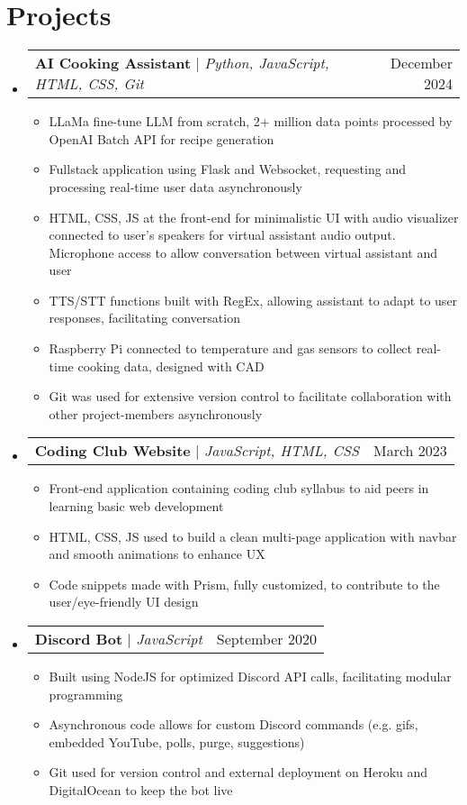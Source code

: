 \documentclass[letterpaper,11pt]{article}
\makeatletter
\newcommand{\resumeItem}[1]{
  \item\small{
    {#1 \vspace{-2pt}}
  }
}
\newcommand{\resumeProjectHeading}[2]{
    \item
    \begin{tabular*}{0.97\textwidth}{l@{\extracolsep{\fill}}r}
      \small#1 & #2 \\
    \end{tabular*}\vspace{-7pt}
}
\newcommand{\resumeSubHeadingListStart}{\begin{itemize}[leftmargin=0.15in, label={}]}
\newcommand{\resumeSubHeadingListEnd}{\end{itemize}}
\newcommand{\resumeItemListStart}{\begin{itemize}}
\newcommand{\resumeItemListEnd}{\end{itemize}\vspace{-8pt}}
\makeatother
\begin{document}
 \vspace{-15pt}



\section{Projects}
  \resumeSubHeadingListStart
    \resumeProjectHeading
        {\textbf{AI Cooking Assistant} $|$ \emph{Python, JavaScript, HTML, CSS, Git}}{December 2024}
        \resumeItemListStart
          \resumeItem{LLaMa fine-tune LLM from scratch, 2+ million data points processed by OpenAI Batch API for recipe generation}
          \resumeItem{Fullstack application using Flask and Websocket, requesting and processing real-time user data asynchronously}
          \resumeItem{HTML, CSS, JS at the front-end for minimalistic UI with audio visualizer connected to user's speakers for virtual assistant audio output. Microphone access to allow conversation between virtual assistant and user}
          \resumeItem{TTS/STT functions built with RegEx, allowing assistant to adapt to user responses, facilitating conversation}
          \resumeItem{Raspberry Pi connected to temperature and gas sensors to collect real-time cooking data, designed with CAD}
          \resumeItem{Git was used for extensive version control to facilitate collaboration with other project-members asynchronously}
        \resumeItemListEnd
    \resumeProjectHeading
        {\textbf{Coding Club Website} $|$ \emph{JavaScript, HTML, CSS}}{March 2023}
        \resumeItemListStart
          \resumeItem{Front-end application containing coding club syllabus to aid peers in learning basic web development}
          \resumeItem{HTML, CSS, JS used to build a clean multi-page application with navbar and smooth animations to enhance UX}
          \resumeItem{Code snippets made with Prism, fully customized, to contribute to the user/eye-friendly UI design}
        \resumeItemListEnd
    \resumeProjectHeading
      {\textbf{Discord Bot} $|$ \emph{JavaScript}}{September 2020}
      \resumeItemListStart
        \resumeItem{Built using NodeJS for optimized Discord API calls, facilitating modular programming}
        \resumeItem{Asynchronous code allows for custom Discord commands (e.g. gifs, embedded YouTube, polls, purge, suggestions)}
        \resumeItem{Git used for version control and external deployment on Heroku and DigitalOcean to keep the bot live}
      \resumeItemListEnd
  \resumeSubHeadingListEnd


\end{document}
